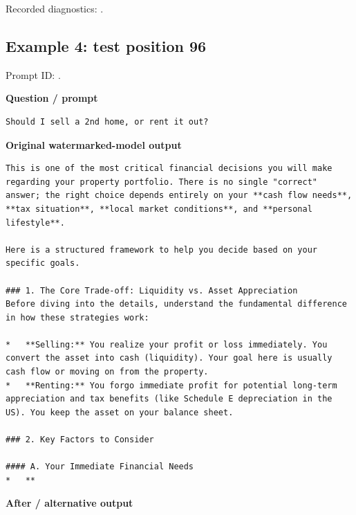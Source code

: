 Recorded diagnostics:
\texttt{}.

\subsection{Example 4: test position
96}\label{record-docs-watermarking-qualitative-text-latent-vanilla-md-example-4-test-position-96}

Prompt ID:
\texttt{}.

\textbf{Question / prompt}

\begin{Verbatim}
Should I sell a 2nd home, or rent it out?
\end{Verbatim}

\textbf{Original watermarked-model output}

\begin{Verbatim}
This is one of the most critical financial decisions you will make regarding your property portfolio. There is no single "correct" answer; the right choice depends entirely on your **cash flow needs**, **tax situation**, **local market conditions**, and **personal lifestyle**.

Here is a structured framework to help you decide based on your specific goals.

### 1. The Core Trade-off: Liquidity vs. Asset Appreciation
Before diving into the details, understand the fundamental difference in how these strategies work:

*   **Selling:** You realize your profit or loss immediately. You convert the asset into cash (liquidity). Your goal here is usually cash flow or moving on from the property.
*   **Renting:** You forgo immediate profit for potential long-term appreciation and tax benefits (like Schedule E depreciation in the US). You keep the asset on your balance sheet.

### 2. Key Factors to Consider

#### A. Your Immediate Financial Needs
*   **
\end{Verbatim}

\textbf{After / alternative output}

